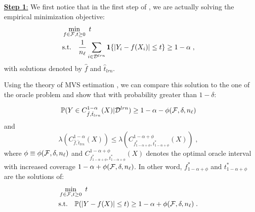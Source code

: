     \underline{\textbf{Step 1}:} We first notice that in the first step of \method, we are actually solving the empirical minimization objective:
    \begin{align*}
       	& \min_{f\in\mathcal{F}, t\geq 0}~ t\\
        &\text{s.t.} \quad \frac{1}{n_\ell}\sum_{i\in{\cal D}^{lrn}}\mathbf{1}\{|Y_i-f(X_i)|\leq t\}\geq 1-\alpha \;, \nonumber
    \end{align*}
    with solutions denoted by $\hat{f}$ and $\hat{t}_{lrn}$.
    
    Using the theory of MVS estimation \citep{NIPS2005_d3d80b65}, we can compare this solution to the one of the oracle problem and show that with probability greater than $1-\delta$:
    
    \begin{equation}
        \label{eq:lower-scott-app}
        {\mathbb{P}}(Y\in C_{\hat{f},\hat{t}_{lrn}}^{1-\alpha}(X)|{\cal D}^{lrn})\geq 1-\alpha - {\phi(\mathcal{F},\delta,n_\ell)}
    \end{equation}
    and
    \begin{equation}
        \label{eq:lower-scott-app2}
        \lambda\left(C_{\hat{f},\hat{t}_{lrn}}^{1-\alpha}(X)\right) \leq \lambda\left(C_{f_{1-\alpha+\phi}^*,t_{1-\alpha+\phi}^*}^{1-\alpha + \phi}(X)\right)\;,
    \end{equation}
    where $\phi \equiv {\phi(\mathcal{F},\delta,n_\ell)}$ and $C_{f_{1-\alpha+\phi}^*,t_{1-\alpha+\phi}^*}^{1-\alpha + \phi}(X)$ denotes the optimal oracle interval with increased coverage $1-\alpha + {\phi(\mathcal{F},\delta,n_\ell)}$. In other word, $f_{1-\alpha+\phi}^*$ and $t_{1-\alpha+\phi}^*$ are the solutions of: 
    \begin{align*}
    	&\min_{f\in\mathcal{F}, t\geq 0}~ t \\
    	&\text{s.t.} \quad {\mathbb{P}}(|Y-f(X)|\leq t)\geq 1-\alpha + {\phi(\mathcal{F},\delta,n_\ell)} \; .
    \end{align*}

